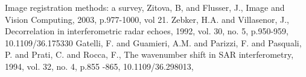 \begin{thebibliography}{123}
 Image registration methods: a survey, Zitova, B, and Flusser, J., Image and Vision Computing, 2003, p.977-1000, vol 21.
  Zebker, H.A. and Villasenor, J., Decorrelation in interferometric radar echoes, 1992, vol. 30, no. 5, p.950-959, 10.1109/36.175330
 Gatelli, F. and Guamieri, A.M. and Parizzi, F. and Pasquali, P. and Prati, C. and Rocca, F., The wavenumber shift in {SAR} interferometry, 1994, vol. 32, no. 4, p.855 -865, 10.1109/36.298013,
\end{thebibliography}
